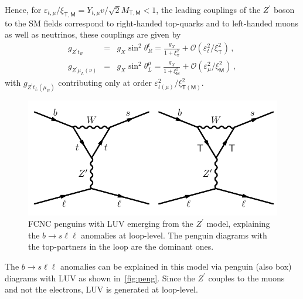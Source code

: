 Hence, for $\varepsilon_{t,\mu}/\xi_{\mathsf{T,M}}= Y_{t,\mu} v/\sqrt{2} M_{\mathsf{T,M}} < 1$, the leading couplings of the $Z^{\prime}$ boson to the SM fields correspond to right-handed top-quarks and to left-handed muons as well as neutrinos, these couplings are given by
\begin{eqnarray}
	\label{eq:Zprime_to_SM}
	g_{Z^{\prime} t_{R}} & = & g_{X} \sin^2 \theta_{R}^{t} = \frac{g_{X}}{ 1+ \xi^2_{\mathsf{T}}} + \mathcal{O}\left( \varepsilon_{t}^2/\xi_{\mathsf{T}}^2 \right) \, , \\
	g_{Z^{\prime} \mu_{L} (\nu)} & = &  g_{X} \sin^2 \theta_{L}^{\mu} = \frac{g_{X}}{1 + \xi^2_{\mathsf{M}}} 
	+ \mathcal{O}\left( \varepsilon_{\mu}^2 /\xi_{\mathsf{M}}^2 \right) \, ,
\end{eqnarray}
with $g_{Z^{\prime} t_{L} (\mu_{R})}$ contributing only at order $\varepsilon_{t  (\mu)}^2/\xi_{\mathsf{T(M)}}^2$.
\begin{figure}[htpb!]
	\centering
	\includegraphics[scale=.75]{figures/zp_penguin.pdf}
	\caption{FCNC penguins with LUV emerging from the $Z^\prime$ model, explaining the $b \to s \ell \ell$ anomalies at loop-level. The penguin diagrams with the top-partners in the loop are the dominant ones. }
	\label{fig:peng}
\end{figure}
The $ b \to s \ell \ell$ anomalies can be explained in this model via penguin (also box) diagrams with LUV as shown in~\autoref{fig:peng}. Since the $Z^\prime$ couples to the muons and not the electrons, LUV is generated at loop-level. 

